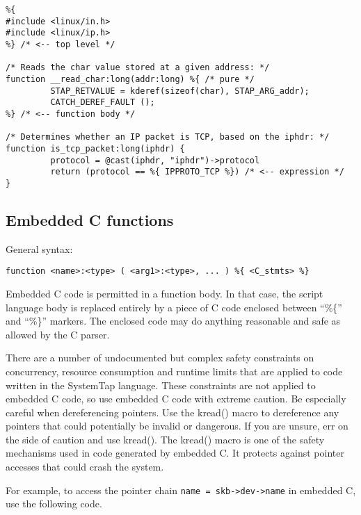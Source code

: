 \documentclass[twoside,english]{article}
\newenvironment{vindent}
{\begin{list}{}{\setlength{\listparindent}{6pt}}
\item[]}
{\end{list}}
\begin{document}
\begin{vindent}
\begin{verbatim}
%{
#include <linux/in.h>
#include <linux/ip.h>
%} /* <-- top level */

/* Reads the char value stored at a given address: */ 
function __read_char:long(addr:long) %{ /* pure */
         STAP_RETVALUE = kderef(sizeof(char), STAP_ARG_addr);
         CATCH_DEREF_FAULT ();
%} /* <-- function body */

/* Determines whether an IP packet is TCP, based on the iphdr: */
function is_tcp_packet:long(iphdr) {
         protocol = @cast(iphdr, "iphdr")->protocol
         return (protocol == %{ IPPROTO_TCP %}) /* <-- expression */
}
\end{verbatim}
\end{vindent}

\subsection{Embedded C functions\label{sub:Embedded-C-Functions}}

General syntax:

\begin{vindent}
\begin{verbatim}
function <name>:<type> ( <arg1>:<type>, ... ) %{ <C_stmts> %}
\end{verbatim}
\end{vindent}
Embedded C code is permitted in a function body.
In that case, the script language
body is replaced entirely by a piece of C code enclosed between 
{}``\%\{'' and {}``\%\}'' markers.
The enclosed code may do anything reasonable and safe as allowed
by the C parser.

There are a number of undocumented but complex safety constraints on concurrency,
resource consumption and runtime limits that are applied to code written
in the SystemTap language. These constraints are not applied to embedded
C code, so use embedded C code with extreme caution. Be especially
careful when dereferencing pointers. Use the kread() macro to dereference
any pointers that could potentially be invalid or dangerous. If you are unsure,
err on the side of caution and use kread(). The kread() macro is one of the
safety mechanisms used in code generated by embedded C. It protects against
pointer accesses that could crash the system.

For example, to access the pointer chain \texttt{name = skb->dev->name} in
embedded C, use the following code.
\end{document}
